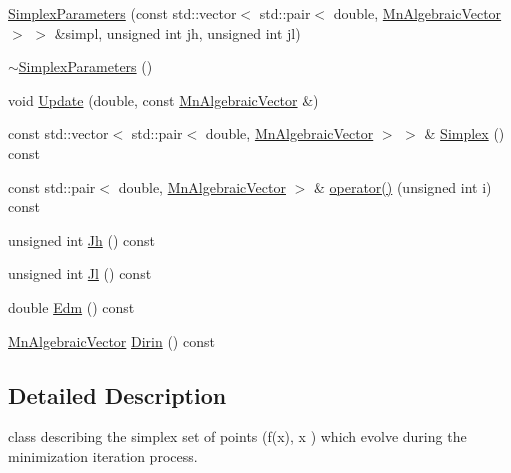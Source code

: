 \begin{DoxyCompactItemize}
\item 
\mbox{\hyperlink{classROOT_1_1Minuit2_1_1SimplexParameters_a65e9ef329f7c1be19f68e0a1b817c584}{Simplex\+Parameters}} (const std\+::vector$<$ std\+::pair$<$ double, \mbox{\hyperlink{namespaceROOT_1_1Minuit2_a62ed97730a1ca8d3fbaec64a19aa11c9}{Mn\+Algebraic\+Vector}} $>$ $>$ \&simpl, unsigned int jh, unsigned int jl)
\item 
\mbox{\hyperlink{classROOT_1_1Minuit2_1_1SimplexParameters_a13162b4c95b96890972dc24e7ba2e9a8}{$\sim$\+Simplex\+Parameters}} ()
\item 
void \mbox{\hyperlink{classROOT_1_1Minuit2_1_1SimplexParameters_aa9536cc9c7754ce308160d5e456ac54f}{Update}} (double, const \mbox{\hyperlink{namespaceROOT_1_1Minuit2_a62ed97730a1ca8d3fbaec64a19aa11c9}{Mn\+Algebraic\+Vector}} \&)
\item 
const std\+::vector$<$ std\+::pair$<$ double, \mbox{\hyperlink{namespaceROOT_1_1Minuit2_a62ed97730a1ca8d3fbaec64a19aa11c9}{Mn\+Algebraic\+Vector}} $>$ $>$ \& \mbox{\hyperlink{classROOT_1_1Minuit2_1_1SimplexParameters_a873b8883c6932b879348e73d36d86afb}{Simplex}} () const
\item 
const std\+::pair$<$ double, \mbox{\hyperlink{namespaceROOT_1_1Minuit2_a62ed97730a1ca8d3fbaec64a19aa11c9}{Mn\+Algebraic\+Vector}} $>$ \& \mbox{\hyperlink{classROOT_1_1Minuit2_1_1SimplexParameters_aa05f3fb5da27277879fad702d85bae49}{operator()}} (unsigned int i) const
\item 
unsigned int \mbox{\hyperlink{classROOT_1_1Minuit2_1_1SimplexParameters_a54250c0d286fcf4d6bbb45df037c7d85}{Jh}} () const
\item 
unsigned int \mbox{\hyperlink{classROOT_1_1Minuit2_1_1SimplexParameters_accfb7ec2b1087661ed3c31dfbb473413}{Jl}} () const
\item 
double \mbox{\hyperlink{classROOT_1_1Minuit2_1_1SimplexParameters_ad71f372dd3873cbf351dc8eddc3a9c9a}{Edm}} () const
\item 
\mbox{\hyperlink{namespaceROOT_1_1Minuit2_a62ed97730a1ca8d3fbaec64a19aa11c9}{Mn\+Algebraic\+Vector}} \mbox{\hyperlink{classROOT_1_1Minuit2_1_1SimplexParameters_a40e7b3b27280a376a063a1c81904cc75}{Dirin}} () const
\end{DoxyCompactItemize}


\subsection{Detailed Description}
class describing the simplex set of points (f(x), x ) which evolve during the minimization iteration process. 

